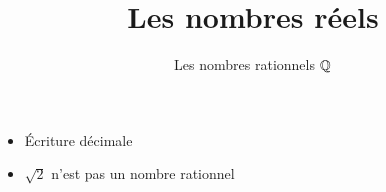 







\title{{\bf Les nombres réels}}
\subtitle{Les nombres rationnels $\mathbb{Q}$}

\begin{frame}
  
  \debutmontitre

  \pause

{\footnotesize
\hfill
{}
\begin{minipage}{0.6\textwidth}
  \begin{itemize}
   \item<3-> \'Ecriture décimale 
   \item<4-> $\sqrt2$ n'est pas un nombre rationnel
  \end{itemize}
\end{minipage}
}

\end{frame}

\setcounter{framenumber}{0}


